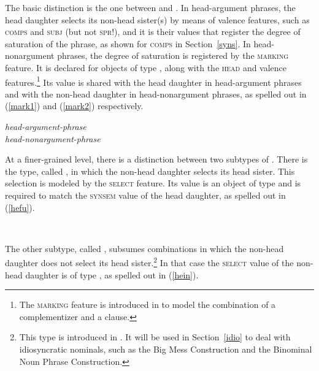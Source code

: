 \documentclass[output=paper,biblatex,babelshorthands,newtxmath,draftmode,colorlinks,citecolor=brown]{langscibook}
\begin{document}
\largerpage
The basic distinction is
the one between  and . 
In head-argument phrases, the head daughter selects its non-head sister(s) by means of 
valence features, such as \textsc{comps} and \textsc{subj} (but not \textsc{spr}!), 
and it is their values that register the degree of saturation of the phrase, 
as shown for \textsc{comps} in Section~\ref{syns}.  
In head-nonargument phrases, the degree of saturation is registered  
by the \textsc{marking} feature. It is declared for objects of type , 
along with the \textsc{head} and valence features.\footnote{The \textsc{marking} feature  
is introduced in \citet[46]{ps2} to model the combination of a complementizer 
and a clause.} Its value is shared with the head daughter in head-argument phrases
and with the non-head daughter in head-nonargument phrases, as spelled out in 
(\ref{mark1}) and (\ref{mark2}) respectively. 

\ea\label{mark1} 
\emph{head-argument-phrase} \impl \\
\z
\ea\label{mark2} 
\emph{head-nonargument-phrase} \impl \\
\z

\noindent
At a finer-grained level, there is a distinction between two subtypes of 
. There is the type, called ,  
in which the non-head daughter selects its head sister. This selection is modeled 
by the \textsc{select} feature. Its value is an object of type  and is 
required to match the \textsc{synsem} value of the head daughter, as spelled out 
in (\ref{hefu}).  

\begin{exe}
\ex\label{hefu} 
 \impl \\
\end{exe} 

\noindent
The other subtype, called , subsumes combinations in 
which the non-head daughter does not select its head sister.\footnote{This type is 
introduced in \citet[130]{VanEynde98a}. It will be used in Section~\ref{idio} to deal with 
idiosyncratic nominals, such as the Big Mess Construction and the Binominal Noun Phrase 
Construction.} In that case the \textsc{select} value of the non-head daughter is of type 
, as spelled out in (\ref{hein}). 
\end{document}
